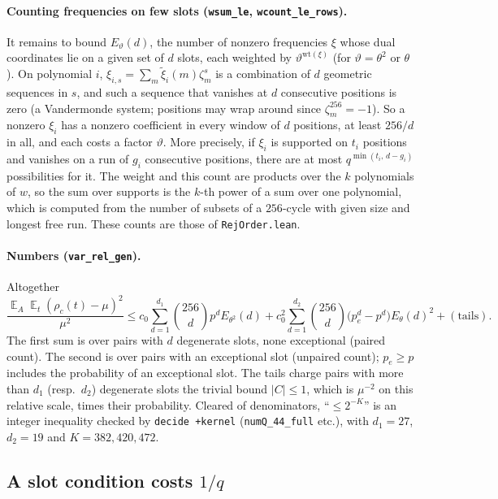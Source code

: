 \documentclass[11pt]{article}
\theoremstyle{definition}
\theoremstyle{remark}
\newcommand{\lean}[1]{\texttt{#1}}
\begin{document}
\paragraph{Counting frequencies on few slots (\lean{wsum\_le}, \lean{wcount\_le\_rows}).}
It remains to bound $E_\vartheta(d)$, the number of nonzero frequencies $\xi$ whose dual
coordinates lie on a given set of $d$ slots, each weighted by $\vartheta^{\mathrm{wt}(\xi)}$
(for $\vartheta = \theta^2$ or $\theta$). On polynomial $i$,
$\xi_{i,s} = \sum_m\tilde\xi_i(m)\zeta_m^s$ is a combination of $d$ geometric sequences in $s$,
and such a sequence that vanishes at $d$ consecutive positions is zero (a Vandermonde system;
positions may wrap around since $\zeta_m^{256}=-1$). So a nonzero $\xi_i$ has a nonzero
coefficient in every window of $d$ positions, at least $256/d$ in all, and each costs a factor
$\vartheta$. More precisely, if $\xi_i$ is supported on $t_i$ positions and vanishes on a run of
$g_i$ consecutive positions, there are at most $q^{\min(t_i,\,d-g_i)}$ possibilities for it. The
weight and this count are products over the $k$ polynomials of $w$, so the sum over supports is
the $k$-th power of a sum over one polynomial, which is computed from the number of subsets of
a $256$-cycle with given size and longest free run. These counts are those of
\lean{RejOrder.lean}.

\paragraph{Numbers (\lean{var\_rel\_gen}).} Altogether
\[
  \frac{\mathop{\mathbb E}_A\mathop{\mathbb E}_t (\rho_c(t)-\mu)^2}{\mu^2}
  \le c_0\sum_{d=1}^{d_1}\binom{256}{d} p^d E_{\theta^2}(d)
    + c_0^2\sum_{d=1}^{d_2}\binom{256}{d}\big(p_e^d - p^d\big) E_\theta(d)^2 + (\text{tails}).
\]
The first sum is over pairs with $d$ degenerate slots, none exceptional (paired count). The
second is over pairs with an exceptional slot (unpaired count); $p_e \ge p$ includes the
probability of an exceptional slot. The tails charge pairs with more than $d_1$ (resp.\ $d_2$)
degenerate slots the trivial bound $|C|\le1$, which is $\mu^{-2}$ on this relative scale, times
their probability. Cleared of denominators, ``$\le 2^{-K}$'' is an integer inequality
checked by \lean{decide +kernel} (\lean{numQ\_44\_full} etc.), with $d_1 = 27$, $d_2 = 19$ and
$K = 382, 420, 472$.

\subsection{A slot condition costs $1/q$}\label{sec:slotq}
\end{document}
